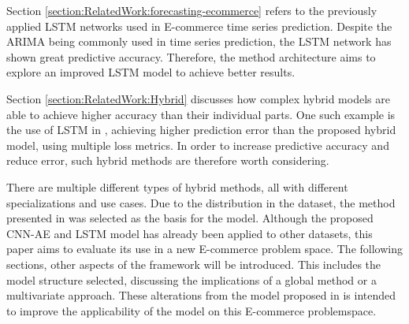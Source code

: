 Section \ref{section:RelatedWork:forecasting-ecommerce}
refers to the previously applied LSTM networks used in E-commerce time series prediction.
Despite the ARIMA being commonly used in time series prediction, the LSTM network has shown great predictive accuracy.
Therefore, the method architecture aims to explore an improved LSTM model to achieve better results.

Section \ref{section:RelatedWork:Hybrid}
discusses how complex hybrid models are able to achieve higher accuracy than their individual parts.
One such example is the use of LSTM in \cite{Zhao2019}, achieving higher prediction error than the proposed hybrid model, using multiple loss metrics.
In order to increase predictive accuracy and reduce error, such hybrid methods are therefore worth considering.


There are multiple different types of hybrid methods, all with different specializations and use cases.
Due to the distribution in the dataset, the method presented in \cite{Zhao2019} was selected as the basis for the model.
Although the proposed CNN-AE and LSTM model has already been applied to other datasets, this paper aims to evaluate its use in a new E-commerce problem space.
The following sections, other aspects of the framework will be introduced.
This includes the model structure selected, discussing the implications of a global method or a multivariate approach.
These alterations from the model proposed in \cite{Zhao2019} is intended to improve the applicability of the model on this E-commerce problemspace.

